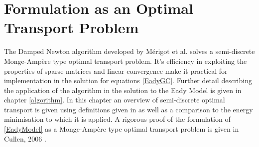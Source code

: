 \chapter{Formulation as an Optimal Transport Problem}
The Damped Newton algorithm developed by M\'{e}rigot et al. \cite{Merigot2017} solves a semi-discrete Monge-Amp\`{e}re type optimal transport problem. It's efficiency in exploiting the properties of sparse matrices and linear convergence \cite{Merigot2017} make it practical for implementation in the solution for equations \ref{EadyGC}. Further detail describing the application of the algorithm in the solution to the Eady Model is given in chapter \ref{algorithm}. In this chapter an overview of semi-discrete optimal transport is given using definitions given in \cite{Kitagawa2016, Merigot2017} as well as a comparison to the energy minimisation to which it is applied. A rigorous proof of the formulation of \ref{EadyModel} as a Monge-Amp\`{e}re type optimal transport problem is given in Cullen, 2006 \cite{Cullen2006a}.

